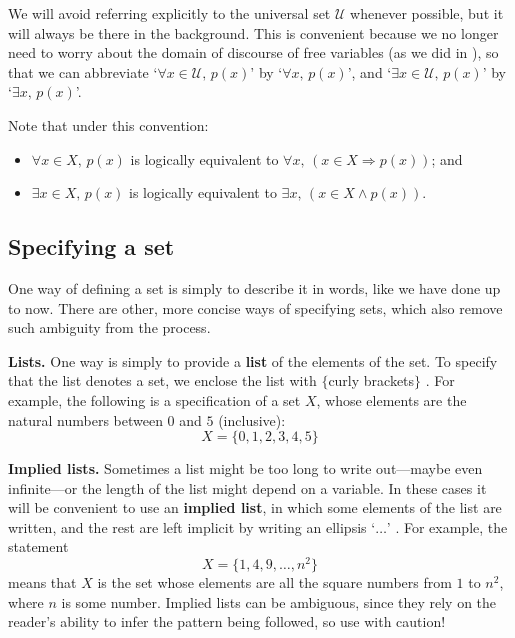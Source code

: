 We will avoid referring explicitly to the universal set $\mathcal{U}$ whenever possible, but it will always be there in the background. This is convenient because we no longer need to worry about the domain of discourse of free variables (as we did in ), so that we can abbreviate `$\forall x \in \mathcal{U},\, p(x)$' by `$\forall x,\, p(x)$', and `$\exists x \in \mathcal{U},\, p(x)$' by `$\exists x,\, p(x)$'.

Note that under this convention:
\begin{itemize}
\item $\forall x \in X,\, p(x)$ is logically equivalent to $\forall x,\, (x \in X \Rightarrow p(x))$; and
\item $\exists x \in X,\, p(x)$ is logically equivalent to $\exists x,\, (x \in X \wedge p(x))$.
\end{itemize}

\subsection*{Specifying a set}
One way of defining a set is simply to describe it in words, like we have done up to now. There are other, more concise ways of specifying sets, which also remove such ambiguity from the process.

\textbf{Lists.}
One way is simply to provide a \textbf{list} of the elements of the set. To specify that the list denotes a set, we enclose the list with $\{$curly brackets$\}$ \inlatex{\{,\textbackslash{}\}}\lindexmmc{\{\dots\textbackslash{}\}}{$\{\dots\}$}. For example, the following is a specification of a set $X$, whose elements are the natural numbers between $0$ and $5$ (inclusive):
\[ X = \{ 0, 1, 2, 3, 4, 5 \} \]

\textbf{Implied lists.}
Sometimes a list might be too long to write out---maybe even infinite---or the length of the list might depend on a variable. In these cases it will be convenient to use an \textbf{implied list}, in which some elements of the list are written, and the rest are left implicit by writing an ellipsis `$\dots$' . For example, the statement
\[ X = \{ 1, 4, 9, \dots, n^2 \} \]
means that $X$ is the set whose elements are all the square numbers from $1$ to $n^2$, where $n$ is some number. Implied lists can be ambiguous, since they rely on the reader's ability to infer the pattern being followed, so use with caution!

